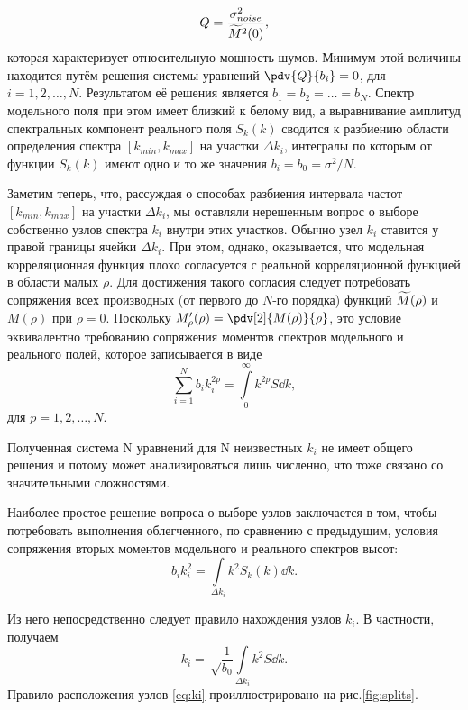 \begin{equation}
	\label{eq:Q}
	Q=\frac{\sigma^2_{noise}}{\widetilde{M}^2(0)},
\end{equation} которая характеризует относительную мощность шумов. Минимум этой величины находится путём решения системы уравнений $\pdv{Q}{b_i}=0$, для $i=1,2,\dots,N.$
Результатом её решения является $b_1=b_2=\dots = b_N$. Спектр модельного поля при этом имеет близкий к белому вид, а выравнивание амплитуд спектральных компонент реального поля $S_k(k)$ сводится к разбиению области определения спектра $[k_{min}, k_{max}]$ на участки $\Delta k_i$, интегралы по которым от функции $S_k(k)$ имеют одно и то же значения $b_i=b_0=\sigma^2/N$.



Заметим теперь, что, рассуждая о способах разбиения интервала частот $[k_{min}, k_{max}]$ на участки $\Delta k_i$, мы оставляли нерешенным вопрос о выборе собственно узлов спектра $k_i$ внутри этих участков. Обычно узел $k_i$ ставится у правой границы ячейки $\Delta k_i$. При этом, однако, оказывается, что модельная корреляционная функция плохо согласуется с реальной корреляционной функцией в области малых $\rho$. Для достижения такого согласия следует потребовать сопряжения всех производных (от первого до $N$-го порядка) функций $\widetilde{M}(\rho)$ и $M(\rho)$ при $\rho=0$. Поскольку $M'_{\rho}(\rho)=\pdv[2]{M(\rho)}{\rho}$, это условие эквивалентно требованию сопряжения моментов спектров модельного и реального полей, которое записывается в виде 
\begin{equation}
	\sum_{i=1}^N b_ik_i^{2p}=\int\limits_{0}^{\infty} k^{2p}S\dd{k},
\end{equation}
для $p=1,2,\dots,N.$

Полученная система N уравнений для N неизвестных $k_i$ не имеет общего решения и потому может анализироваться лишь численно, что тоже связано со значительными сложностями.



Наиболее простое решение вопроса о выборе узлов заключается в том, чтобы потребовать выполнения облегченного, по сравнению с предыдущим, условия сопряжения вторых моментов модельного и реального спектров высот:
\begin{equation}
	b_i k_i^2=\int\limits_{\Delta k_i} k^2 S_k(k)  \dd{k}.
\end{equation}

Из него непосредственно следует правило нахождения узлов $k_i$. В частности, получаем
\begin{equation}
	\label{eq:ki}
	k_i=\sqrt\frac{1}{b_0} \int\limits_{\Delta k_i} k^2 S \dd{k}.
\end{equation}
Правило расположения узлов \eqref{eq:ki} проиллюстрировано на рис.\ref{fig:splits}.

